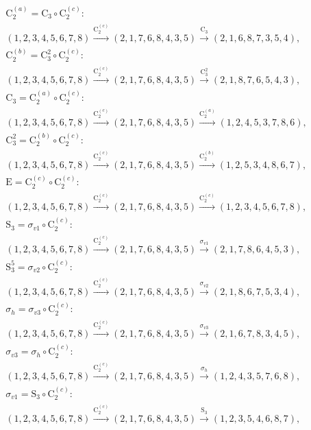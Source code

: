 \begin{align*}
& \mathrm{C}_{2}^{(a)} = \mathrm{C}_{3} \circ \mathrm{C}_{2}^{(c)}:\; \\& (1,2,3,4,5,6,7,8) \xrightarrow{\mathrm{C}_{2}^{(c)}} (2,1,7,6,8,4,3,5) \xrightarrow{\mathrm{C}_{3}} (2,1,6,8,7,3,5,4), \\
& \mathrm{C}_{2}^{(b)} = \mathrm{C}_{3}^{2} \circ \mathrm{C}_{2}^{(c)}:\; \\& (1,2,3,4,5,6,7,8) \xrightarrow{\mathrm{C}_{2}^{(c)}} (2,1,7,6,8,4,3,5) \xrightarrow{\mathrm{C}_{3}^{2}} (2,1,8,7,6,5,4,3), \\
& \mathrm{C}_{3} = \mathrm{C}_{2}^{(a)} \circ \mathrm{C}_{2}^{(c)}:\; \\& (1,2,3,4,5,6,7,8) \xrightarrow{\mathrm{C}_{2}^{(c)}} (2,1,7,6,8,4,3,5) \xrightarrow{\mathrm{C}_{2}^{(a)}} (1,2,4,5,3,7,8,6), \\
& \mathrm{C}_{3}^{2} = \mathrm{C}_{2}^{(b)} \circ \mathrm{C}_{2}^{(c)}:\; \\& (1,2,3,4,5,6,7,8) \xrightarrow{\mathrm{C}_{2}^{(c)}} (2,1,7,6,8,4,3,5) \xrightarrow{\mathrm{C}_{2}^{(b)}} (1,2,5,3,4,8,6,7), \\
& \mathrm{E} = \mathrm{C}_{2}^{(c)} \circ \mathrm{C}_{2}^{(c)}:\; \\& (1,2,3,4,5,6,7,8) \xrightarrow{\mathrm{C}_{2}^{(c)}} (2,1,7,6,8,4,3,5) \xrightarrow{\mathrm{C}_{2}^{(c)}} (1,2,3,4,5,6,7,8), \\
& \mathrm{S}_{3} = \sigma_{v1} \circ \mathrm{C}_{2}^{(c)}:\; \\& (1,2,3,4,5,6,7,8) \xrightarrow{\mathrm{C}_{2}^{(c)}} (2,1,7,6,8,4,3,5) \xrightarrow{\sigma_{v1}} (2,1,7,8,6,4,5,3), \\
& \mathrm{S}_{3}^{5} = \sigma_{v2} \circ \mathrm{C}_{2}^{(c)}:\; \\& (1,2,3,4,5,6,7,8) \xrightarrow{\mathrm{C}_{2}^{(c)}} (2,1,7,6,8,4,3,5) \xrightarrow{\sigma_{v2}} (2,1,8,6,7,5,3,4), \\
& \sigma_{h} = \sigma_{v3} \circ \mathrm{C}_{2}^{(c)}:\; \\& (1,2,3,4,5,6,7,8) \xrightarrow{\mathrm{C}_{2}^{(c)}} (2,1,7,6,8,4,3,5) \xrightarrow{\sigma_{v3}} (2,1,6,7,8,3,4,5), \\
& \sigma_{v3} = \sigma_{h} \circ \mathrm{C}_{2}^{(c)}:\; \\& (1,2,3,4,5,6,7,8) \xrightarrow{\mathrm{C}_{2}^{(c)}} (2,1,7,6,8,4,3,5) \xrightarrow{\sigma_{h}} (1,2,4,3,5,7,6,8), \\
& \sigma_{v1} = \mathrm{S}_{3} \circ \mathrm{C}_{2}^{(c)}:\; \\& (1,2,3,4,5,6,7,8) \xrightarrow{\mathrm{C}_{2}^{(c)}} (2,1,7,6,8,4,3,5) \xrightarrow{\mathrm{S}_{3}} (1,2,3,5,4,6,8,7), \\

\end{align*}
